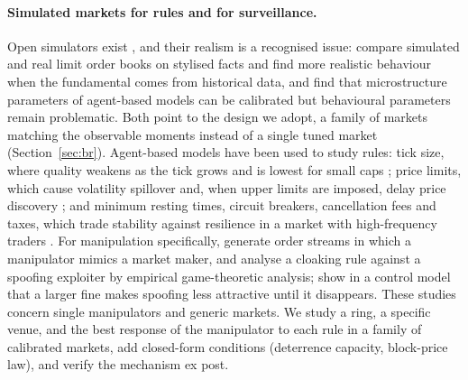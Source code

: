\paragraph{Simulated markets for rules and for surveillance.} Open simulators exist \citep{byrd2020}, and their realism is a recognised issue: \citet{vyetrenko2019} compare simulated and real limit order books on stylised facts and find more realistic behaviour when the fundamental comes from historical data, and \citet{platt2018} find that microstructure parameters of agent-based models can be calibrated but behavioural parameters remain problematic. Both point to the design we adopt, a family of markets matching the observable moments instead of a single tuned market (Section~\ref{sec:br}). Agent-based models have been used to study rules: tick size, where quality weakens as the tick grows and is lowest for small caps \citep{zhao2020}; price limits, which cause volatility spillover and, when upper limits are imposed, delay price discovery \citep{zhang2016}; and minimum resting times, circuit breakers, cancellation fees and taxes, which trade stability against resilience in a market with high-frequency traders \citep{leal2019}. For manipulation specifically, \citet{wang2020} generate order streams in which a manipulator mimics a market maker, and \citet{wang2018} analyse a cloaking rule against a spoofing exploiter by empirical game-theoretic analysis; \citet{cartea2020} show in a control model that a larger fine makes spoofing less attractive until it disappears. These studies concern single manipulators and generic markets. We study a ring, a specific venue, and the best response of the manipulator to each rule in a family of calibrated markets, add closed-form conditions (deterrence capacity, block-price law), and verify the mechanism ex post.

